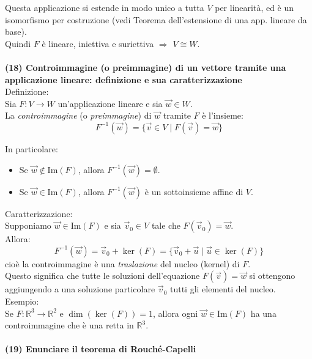 \documentclass[10pt]{extarticle}
\begin{document}
Questa applicazione si estende in modo unico a tutta $V$ per linearità, ed è un isomorfismo per costruzione (vedi Teorema dell’estensione di una app. lineare da base).\\

Quindi $F$ è lineare, iniettiva e suriettiva $\Rightarrow$ $V \cong W$. \hfill \\
\vspace{1em}\\
\textbf{(18) Controimmagine (o preimmagine) di un vettore tramite una applicazione lineare: definizione e sua caratterizzazione}\\

Definizione:\\
Sia $F : V \to W$ un'applicazione lineare e sia $\vec{w} \in W$.\\
La \textit{controimmagine} (o \textit{preimmagine}) di $\vec{w}$ tramite $F$ è l'insieme:
\[
F^{-1}(\vec{w}) = \{ \vec{v} \in V \mid F(\vec{v}) = \vec{w} \}
\]

In particolare:
\begin{itemize}
    \item Se $\vec{w} \notin \text{Im}(F)$, allora $F^{-1}(\vec{w}) = \emptyset$.
    \item Se $\vec{w} \in \text{Im}(F)$, allora $F^{-1}(\vec{w})$ è un sottoinsieme affine di $V$.
\end{itemize}

Caratterizzazione:\\
Supponiamo $\vec{w} \in \text{Im}(F)$ e sia $\vec{v}_0 \in V$ tale che $F(\vec{v}_0) = \vec{w}$.\\
Allora:
\[
F^{-1}(\vec{w}) = \vec{v}_0 + \ker(F) = \{ \vec{v}_0 + \vec{u} \mid \vec{u} \in \ker(F) \}
\]
cioè la controimmagine è una \textit{traslazione} del nucleo (kernel) di $F$.\\

Questo significa che tutte le soluzioni dell’equazione $F(\vec{v}) = \vec{w}$ si ottengono aggiungendo a una soluzione particolare $\vec{v}_0$ tutti gli elementi del nucleo.\\

Esempio:\\
Se $F : \mathbb{R}^3 \to \mathbb{R}^2$ e $\dim(\ker(F)) = 1$, allora ogni $\vec{w} \in \text{Im}(F)$ ha una controimmagine che è una retta in $\mathbb{R}^3$.\\
\vspace{1em}\\
\textbf{(19) Enunciare il teorema di Rouché-Capelli}\\
\end{document}
